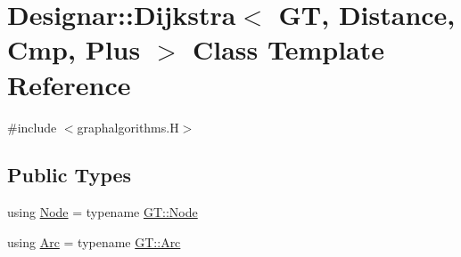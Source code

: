 \hypertarget{class_designar_1_1_dijkstra}{}\section{Designar\+:\+:Dijkstra$<$ GT, Distance, Cmp, Plus $>$ Class Template Reference}
\label{class_designar_1_1_dijkstra}


{\ttfamily \#include $<$graphalgorithms.\+H$>$}

\subsection*{Public Types}
\begin{DoxyCompactItemize}
\item 
using \hyperlink{class_designar_1_1_dijkstra_afeb644fc5395569ec366f0d220ab477d}{Node} = typename \hyperlink{class_designar_1_1_graph_a5dfc7dba9d092ac489c72e40390c37d0}{G\+T\+::\+Node}
\item 
using \hyperlink{class_designar_1_1_dijkstra_a5f0682f4edfd1456b7d4432fa976c641}{Arc} = typename \hyperlink{class_designar_1_1_graph_a74c730ef4ce2d20f998d72bd25c2b5bf}{G\+T\+::\+Arc}
\end{DoxyCompactItemize}
